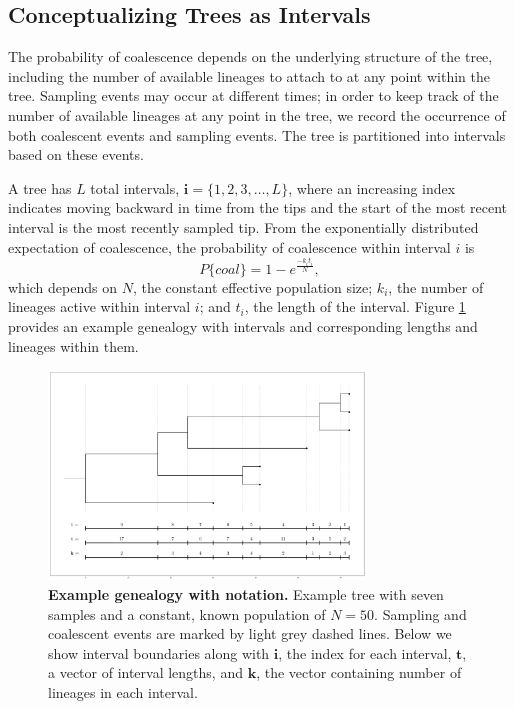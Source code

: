 \documentclass[11pt,oneside,letterpaper]{article}
\newcommand\tab[1][1cm]{\hspace*{#1}}
\begin{document}
\subsection*{Conceptualizing Trees as Intervals}
\tab The probability of coalescence depends on the underlying structure of the tree, including the number of available lineages to attach to at any point within the tree. Sampling events may occur at different times; in order to keep track of the number of available lineages at any point in the tree, we record the occurrence of both coalescent events and sampling events. The tree is partitioned into intervals based on these events. 

\tab A tree has $L$ total intervals, $\textbf{i} = \{1, 2, 3, \dots, L\}$, where an increasing index indicates moving backward in time from the tips and the start of the most recent interval is the most recently sampled tip. From the exponentially distributed expectation of coalescence, the probability of coalescence within interval $i$ is
\begin{equation} \label{eq_1}
	P\{coal\} = 1-e^{\frac{-k_it_i}{N}},
\end{equation}
which depends on $N$, the constant effective population size; $k_i$, the number of lineages active within interval $i$; and $t_i$, the length of the interval. Figure \ref{F-intervals} provides an example genealogy with intervals and corresponding lengths and lineages within them.

\begin{figure}[h]
 \centering
	\includegraphics[width=0.75\textwidth]{figures/toy-intervals}
	\caption{\textbf{Example genealogy with notation.}
	Example tree with seven samples and a constant, known population of $N=50$. Sampling and coalescent events are marked by light grey dashed lines. Below we show interval boundaries along with $\textbf{i}$, the index for each interval, $\textbf{t}$, a vector of interval lengths, and $\textbf{k}$, the vector containing number of lineages in each interval.
	}
	\label{F-intervals}
\end{figure}
\end{document}
